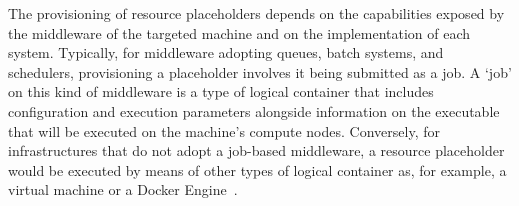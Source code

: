 \documentclass{sig-alternate}
\begin{document}
 



The provisioning of resource placeholders depends on the capabilities exposed by
the middleware of the targeted machine and on the implementation of each \pilot
system. Typically, for middleware adopting queues, batch systems, and
schedulers, provisioning a placeholder involves it being submitted as a job. A
`job' on this kind of middleware is a type of logical container that includes
configuration and execution parameters alongside information on the executable
that will be executed on the machine's compute nodes. Conversely, for
infrastructures that do not adopt a job-based middleware, a resource placeholder
would be executed by means of other types of logical container as, for example,
a virtual machine or a Docker Engine~\cite{bernstein2014,felter2014}.
\end{document}
